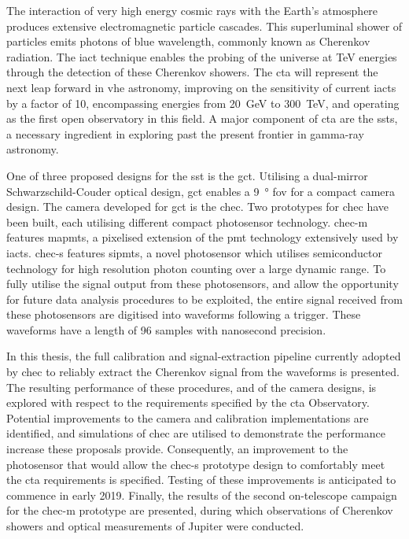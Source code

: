 The interaction of very high energy cosmic rays with the Earth's atmosphere produces extensive electromagnetic particle cascades. This superluminal shower of particles emits photons of blue wavelength, commonly known as Cherenkov radiation. The \gls{iact} technique enables the probing of the universe at \si{TeV} energies through the detection of these Cherenkov showers. The \gls{cta} will represent the next leap forward in \gls{vhe} astronomy, improving on the sensitivity of current \glspl{iact} by a factor of 10, encompassing energies from \SI{20}{GeV} to \SI{300}{TeV}, and operating as the first open observatory in this field. A major component of \gls{cta} are the \glspl{sst}, a necessary ingredient in exploring past the present frontier in gamma-ray astronomy.

One of three proposed designs for the \gls{sst} is the \gls{gct}. Utilising a dual-mirror Schwarzschild-Couder optical design, \gls{gct} enables a \SI{9}{\degree} \gls{fov} for a compact camera design. The camera developed for \gls{gct} is the \gls{chec}. Two prototypes for \gls{chec} have been built, each utilising different compact photosensor technology. \gls{chec-m} features \glspl{mapmt}, a pixelised extension of the \gls{pmt} technology extensively used by \glspl{iact}. \gls{chec-s} features \glspl{sipmt}, a novel photosensor which utilises semiconductor technology for high resolution photon counting over a large dynamic range. To fully utilise the signal output from these photosensors, and allow the opportunity for future data analysis procedures to be exploited, the entire signal received from these photosensors are digitised into waveforms following a trigger. These waveforms have a length of 96 samples with nanosecond precision.

In this thesis, the full calibration and signal-extraction pipeline currently adopted by \gls{chec} to reliably extract the Cherenkov signal from the waveforms is presented. The resulting performance of these procedures, and of the camera designs, is explored with respect to the requirements specified by the \gls{cta} Observatory. Potential improvements to the camera and calibration implementations are identified, and simulations of \gls{chec} are utilised to demonstrate the performance increase these proposals provide. Consequently, an improvement to the photosensor that would allow the \gls{chec-s} prototype design to comfortably meet the \gls{cta} requirements is specified. Testing of these improvements is anticipated to commence in early 2019. Finally, the results of the second on-telescope campaign for the \gls{chec-m} prototype are presented, during which observations of Cherenkov showers and optical measurements of Jupiter were conducted.